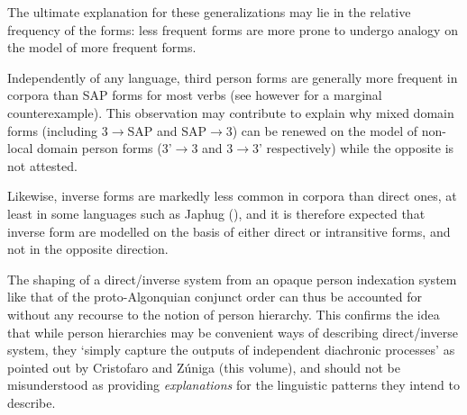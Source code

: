 \documentclass[twoside,a4paper,11pt]{article}
\newcommand{\Σ}{\greek{Σ}}
\begin{document}
The ultimate explanation for these generalizations may lie in the relative frequency of the forms: less frequent forms are more prone to undergo analogy on the model of more frequent forms. 

Independently of any language, third person forms are generally more frequent in corpora than SAP forms for most verbs (see however \citealt{jacques16ebde} for a marginal counterexample).  This observation may contribute to explain why mixed domain forms (including 3$\rightarrow$SAP and SAP$\rightarrow$3) can be renewed on the model of non-local domain person forms (3'$\rightarrow$3 and 3$\rightarrow$3' respectively) while the opposite is not attested.
 
Likewise, inverse forms are markedly less common in corpora than direct ones, at least in some languages such as Japhug (\citealt{jacques10inverse}), and it is therefore expected that inverse form are modelled on the basis of either direct or intransitive forms, and not in the opposite direction.

 The shaping of a direct/inverse system from an opaque person indexation system like that of the proto-Algonquian conjunct order can thus be accounted for without any recourse to the notion of person hierarchy. This confirms the idea that while person hierarchies may be convenient ways of describing direct/inverse system, they `simply capture the outputs of independent diachronic processes' as pointed out by Cristofaro and Zúniga (this volume), and should not be misunderstood as providing \textit{explanations} for the linguistic patterns they intend to describe.

 
 
\end{document}
